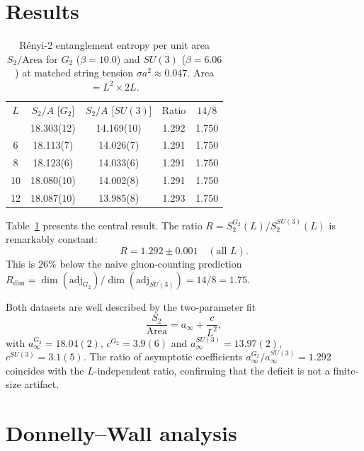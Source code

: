 \documentclass[twocolumn,prd,nofootinbib]{revtex4-2}
\begin{document}
\section{Results}

\begin{table}[t]
\caption{R\'enyi-2 entanglement entropy per unit area $S_2/\mathrm{Area}$ for $G_2$ ($\beta = 10.0$) and $SU(3)$ ($\beta = 6.06$) at matched string tension $\sigma a^2 \approx 0.047$. Area $= L^2 \times 2L$.}
\label{tab:data}
\begin{ruledtabular}
\begin{tabular}{ccccc}
$L$ & $S_2/A$ [$G_2$] & $S_2/A$ [$SU(3)$] & Ratio & $14/8$ \\
\colrule
4  & 18.303(12) & 14.169(10) & 1.292 & 1.750 \\
6  & 18.113(7)  & 14.026(7)  & 1.291 & 1.750 \\
8  & 18.123(6)  & 14.033(6)  & 1.291 & 1.750 \\
10 & 18.080(10) & 14.002(8)  & 1.291 & 1.750 \\
12 & 18.087(10) & 13.985(8)  & 1.293 & 1.750 \\
\end{tabular}
\end{ruledtabular}
\end{table}

Table~\ref{tab:data} presents the central result. The ratio $R = S_2^{G_2}(L) / S_2^{SU(3)}(L)$ is remarkably constant:
\begin{equation}
R = 1.292 \pm 0.001 \quad (\text{all } L).
\end{equation}
This is $26\%$ below the naive gluon-counting prediction $R_{\dim} = \dim(\mathrm{adj}_{G_2})/\dim(\mathrm{adj}_{SU(3)}) = 14/8 = 1.75$.

Both datasets are well described by the two-parameter fit
\begin{equation}
\frac{S_2}{\mathrm{Area}} = a_\infty + \frac{c}{L^2},
\end{equation}
with $a_\infty^{G_2} = 18.04(2)$, $c^{G_2} = 3.9(6)$ and $a_\infty^{SU(3)} = 13.97(2)$, $c^{SU(3)} = 3.1(5)$. The ratio of asymptotic coefficients $a_\infty^{G_2}/a_\infty^{SU(3)} = 1.292$ coincides with the $L$-independent ratio, confirming that the deficit is not a finite-size artifact.

\section{Donnelly--Wall analysis}
\end{document}
